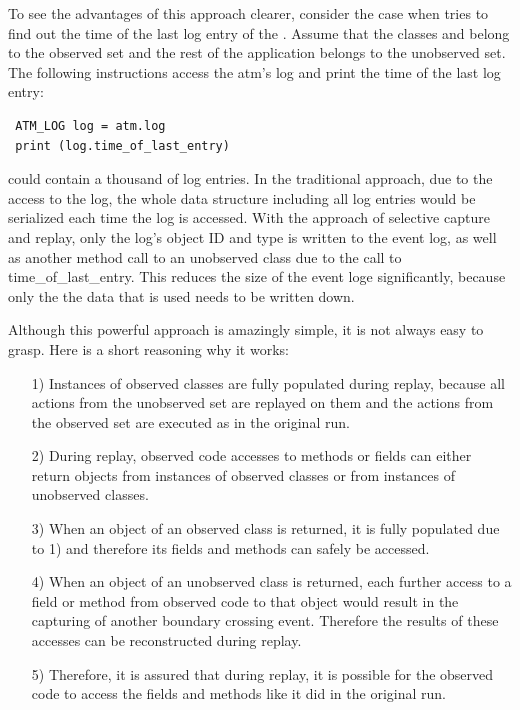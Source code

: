 To see the advantages of this approach clearer, consider the case when  tries to find out the time of the last log entry of the . Assume that the classes  and  belong to the observed set and the rest of the application belongs to the unobserved set. The following instructions access the atm's log and print the time of the last log entry:
\javalisting
\begin{lstlisting}
 ATM_LOG log = atm.log
 print (log.time_of_last_entry)
\end{lstlisting}
 could contain a thousand of log entries. In the traditional approach, due to the access to the log, the whole data structure including all log entries would be serialized each time the log is accessed. With the approach of selective capture and replay, only the log's object ID and type is written to the event log, as well as another method call to an unobserved class due to the call to time\_of\_last\_entry. This reduces the size of the event loge significantly, because only the the data that is used needs to be written down.

Although this powerful approach is amazingly simple, it is not always easy to grasp. Here is a short reasoning why it works:
\begin{enumerate}
  \item [1)] Instances of observed classes are fully populated during replay, because all actions from the unobserved set are replayed on them and the actions from the observed set are executed as in the original run.
  \item [2)] During replay, observed code accesses to methods or fields can either return objects from instances of observed classes or from instances of unobserved classes.
  \item [3)] When an object of an observed class is returned, it is fully populated due to 1) and therefore its fields and methods can safely be accessed.
  \item [4)] When an object of an unobserved class is returned, each further access to a field or method from observed code to that object would result in the capturing of another boundary crossing event. Therefore the results of these accesses can be reconstructed during replay.
  \item [5)] Therefore, it is assured that during replay, it is possible for the observed code to access the fields and methods like it did in the original run.
\end{enumerate}



